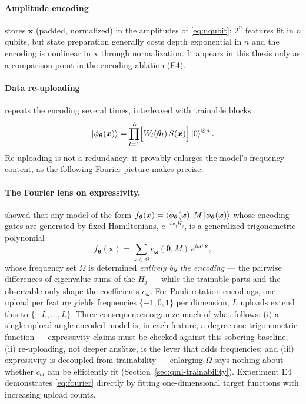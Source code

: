 \paragraph{Amplitude encoding} stores $\bm{x}$ (padded, normalized) in the
amplitudes of \eqref{eq:nqubit}: $2^n$ features fit in $n$ qubits, but state
preparation generally costs depth exponential in $n$ and the encoding is
nonlinear in $\bm{x}$ through normalization. It appears in this thesis only
as a comparison point in the encoding ablation (E4).

\paragraph{Data re-uploading} repeats the encoding several times, interleaved
with trainable blocks \citep{perezsalinas2020reuploading}:
\begin{equation}
  \left|\phi_{\bm{\theta}}(\bm{x})\right\rangle
  = \prod_{l=1}^{L} \Bigl[ W_l(\bm{\theta}_l)\, S(\bm{x}) \Bigr]
    \left|0\right\rangle^{\otimes n}.
  \label{eq:reuploading}
\end{equation}
Re-uploading is not a redundancy: it provably enlarges the model's frequency
content, as the following Fourier picture makes precise.

\paragraph{The Fourier lens on expressivity.}
\citet{schuld2021fourier} showed that any model of the form
$f_{\bm{\theta}}(\bm{x}) = \left\langle\phi_{\bm{\theta}}(\bm{x})\right| M
\left|\phi_{\bm{\theta}}(\bm{x})\right\rangle$ whose encoding gates are generated by fixed
Hamiltonians, $e^{-i x_j H_j}$, is a generalized trigonometric polynomial
\begin{equation}
  f_{\bm{\theta}}(\bm{x})
  = \sum_{\bm{\omega} \in \Omega} c_{\bm{\omega}}(\bm{\theta}, M)\,
    e^{i \bm{\omega}^{\top} \bm{x}},
  \label{eq:fourier}
\end{equation}
whose frequency set $\Omega$ is determined \emph{entirely by the encoding} ---
the pairwise differences of eigenvalue sums of the $H_j$ --- while the
trainable parts and the observable only shape the coefficients
$c_{\bm{\omega}}$. For Pauli-rotation encodings, one upload per feature yields
frequencies $\{-1, 0, 1\}$ per dimension; $L$ uploads extend this to
$\{-L, \dots, L\}$. Three consequences organize much of what follows:
(i) a single-upload angle-encoded model is, in each feature, a degree-one
trigonometric function --- expressivity claims must be checked against this
sobering baseline; (ii) re-uploading, not deeper ansätze, is the lever that
adds frequencies; and (iii) expressivity is decoupled from trainability ---
enlarging $\Omega$ says nothing about whether $c_{\bm{\omega}}$ can be
efficiently fit (Section~\ref{sec:qml-trainability}). Experiment E4
demonstrates \eqref{eq:fourier} directly by fitting one-dimensional target
functions with increasing upload counts.


